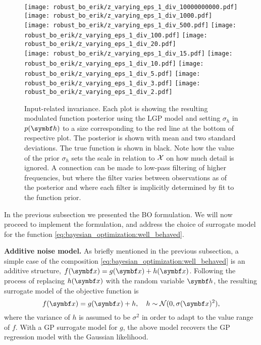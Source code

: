 \begin{figure}[t]
    \centering
    \texttt{[image: robust\_bo\_erik/z\_varying\_eps\_1\_div\_10000000000.pdf]}
    \texttt{[image: robust\_bo\_erik/z\_varying\_eps\_1\_div\_1000.pdf]}
    \texttt{[image: robust\_bo\_erik/z\_varying\_eps\_1\_div\_500.pdf]}
    \texttt{[image: robust\_bo\_erik/z\_varying\_eps\_1\_div\_100.pdf]}
    \texttt{[image: robust\_bo\_erik/z\_varying\_eps\_1\_div\_20.pdf]}\\
    \hspace{-0.01cm}
    \texttt{[image: robust\_bo\_erik/z\_varying\_eps\_1\_div\_15.pdf]}
    \texttt{[image: robust\_bo\_erik/z\_varying\_eps\_1\_div\_10.pdf]}
    \texttt{[image: robust\_bo\_erik/z\_varying\_eps\_1\_div\_5.pdf]}
    \texttt{[image: robust\_bo\_erik/z\_varying\_eps\_1\_div\_3.pdf]}
    \texttt{[image: robust\_bo\_erik/z\_varying\_eps\_1\_div\_2.pdf]}
    \caption{
    \label{fig:bayesian_optimization:varying_z_sigma}
    Input-related invariance.
    Each plot is showing the resulting modulated function posterior using the LGP model and setting $\sigma_h$ in $p(\mat{h})$ to a size corresponding to the
    red line at the bottom of respective plot.
    The posterior is shown with mean and two standard deviations.
    The true function is shown in black.
    Note how the value of the prior $\sigma_h$ sets the scale in relation to $\mathcal{X}$ on how much detail is ignored.
    A connection can be made to low-pass filtering of higher frequencies, but where the filter varies between observations as of the posterior and where each filter is implicitly determined
    by fit to the function prior.
    }
\end{figure}

In the previous subsection we presented the BO formulation.
We will now proceed to implement the formulation, and address the choice of surrogate model for the function \cref{eq:bayesian_optimization:well_behaved}.

\textbf{Additive noise model.}
As briefly mentioned in the previous subsection, a simple case of the composition \cref{eq:bayesian_optimization:well_behaved} is an additive structure, $f(\mat{x}) = g(\mat{x})+h(\mat{x})$.
Following the process of replacing $h(\mat{x})$ with the random variable $\mat{h}$, the resulting surrogate model of the objective function is
\begin{equation}
    f(\mat{x}) = g(\mat{x}) + h, \quad h \sim \mathcal{N}(0, \sigma(\mat{x})^2),
\end{equation}
where the variance of $h$ is assumed to be $\sigma^2$ in order to adapt to the value range of $f$.
With a GP surrogate model for $g$, the above model recovers the GP regression model with the Gaussian likelihood.

